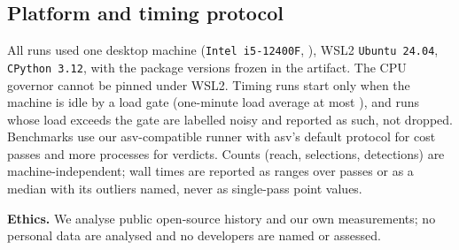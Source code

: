 \subsection{Platform and timing protocol}
All runs used one desktop machine (\texttt{Intel i5-12400F}, ), WSL2 \texttt{Ubuntu 24.04}, \texttt{CPython 3.12}, with the package versions frozen in the artifact.
The CPU governor cannot be pinned under WSL2.
Timing runs start only when the machine is idle by a load gate (one-minute load average at most \LoadGate), and runs whose load exceeds the gate are labelled noisy and reported as such, not dropped.
Benchmarks use our asv-compatible runner with asv's default protocol for cost passes and more processes for verdicts.
Counts (reach, selections, detections) are machine-independent; wall times are reported as ranges over passes or as a median with its outliers named, never as single-pass point values.

\textbf{Ethics.} We analyse public open-source history and our own measurements; no personal data are analysed and no developers are named or assessed.
